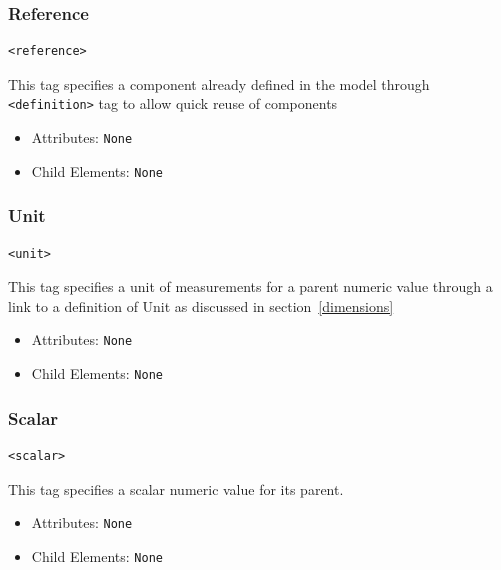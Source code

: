 \documentclass{article}
\begin{document}
\subsubsection{Reference}
%
\begin{lstlisting}
<reference>
\end{lstlisting}

This tag specifies a component already defined in the model through
\verb|<definition>| tag to allow quick reuse of components

\begin{itemize}
\item Attributes: \texttt{None}

\item Child Elements: \texttt{None}

\end{itemize}

\subsubsection{Unit}
%
\begin{lstlisting}
<unit>
\end{lstlisting}

This tag specifies a unit of measurements for a parent numeric value
through a link to a definition of Unit as discussed in
section~\ref{dimensions}

\begin{itemize}
\item Attributes: \texttt{None}

\item Child Elements: \texttt{None}

\end{itemize}

\subsubsection{Scalar}
%
\begin{lstlisting}
<scalar>
\end{lstlisting}

This tag specifies a scalar numeric value for its parent.

\begin{itemize}
\item Attributes: \texttt{None}

\item Child Elements: \texttt{None}

\end{itemize}
\end{document}
